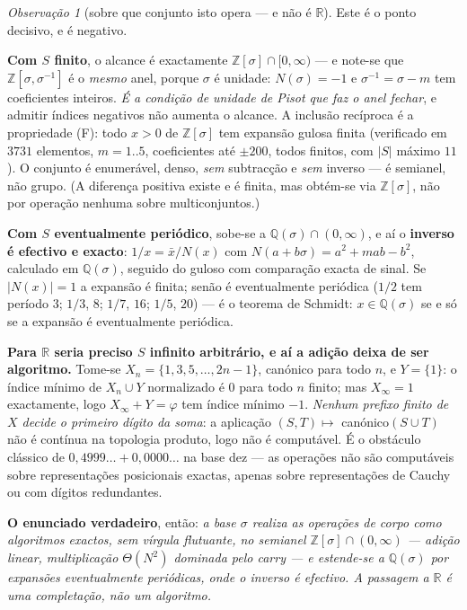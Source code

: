 \documentclass[11pt,a4paper]{article}
\theoremstyle{plain}
\theoremstyle{definition}
\theoremstyle{remark}
\newtheorem{obs}[teorema]{Observação}
\newcommand{\R}{\mathbb{R}}
\newcommand{\Q}{\mathbb{Q}}
\newcommand{\Z}{\mathbb{Z}}
\begin{document}
\begin{obs}[sobre que conjunto isto opera --- e não é $\R$]\label{obs:opfecha}
Este é o ponto decisivo, e é negativo.

\textbf{Com $S$ finito}, o alcance é exactamente $\Z[\sigma]\cap[0,\infty)$ --- e note-se que
$\Z[\sigma,\sigma^{-1}]$ é o \emph{mesmo} anel, porque $\sigma$ é unidade: $N(\sigma) = -1$ e
$\sigma^{-1} = \sigma-m$ tem coeficientes inteiros. \emph{É a condição de unidade de Pisot que faz
o anel fechar}, e admitir índices negativos não aumenta o alcance. A inclusão recíproca é a
propriedade (F): todo $x>0$ de $\Z[\sigma]$ tem expansão gulosa finita (verificado em $3731$
elementos, $m=1..5$, coeficientes até $\pm200$, todos finitos, com $|S|$ máximo $11$). O conjunto é
enumerável, denso,
\emph{sem} subtracção e \emph{sem} inverso --- é semianel, não grupo. (A diferença positiva existe
e é finita, mas obtém-se via $\Z[\sigma]$, não por operação nenhuma sobre multiconjuntos.)

\textbf{Com $S$ eventualmente periódico}, sobe-se a $\Q(\sigma)\cap(0,\infty)$, e aí o
\textbf{inverso é efectivo e exacto}: $1/x = \bar x / N(x)$ com $N(a+b\sigma) = a^2+mab-b^2$,
calculado em $\Q(\sigma)$, seguido do guloso com comparação exacta de sinal. Se $|N(x)|=1$ a
expansão é finita; senão é eventualmente periódica ($1/2$ tem período $3$; $1/3$, $8$; $1/7$, $16$;
$1/5$, $20$) --- é o teorema de Schmidt: $x\in\Q(\sigma)$ se e só se a expansão é eventualmente
periódica.

\textbf{Para $\R$ seria preciso $S$ infinito arbitrário, e aí a adição deixa de ser algoritmo.}
Tome-se $X_n = \{1,3,5,\dots,2n-1\}$, canónico para todo $n$, e $Y=\{1\}$: o índice mínimo de
$X_n\cup Y$ normalizado é $0$ para todo $n$ finito; mas $X_\infty = 1$ exactamente, logo
$X_\infty + Y = \varphi$ tem índice mínimo $-1$. \emph{Nenhum prefixo finito de $X$ decide o
primeiro dígito da soma}: a aplicação $(S,T)\mapsto$ canónico$(S\cup T)$ não é contínua na topologia
produto, logo não é computável. É o obstáculo clássico de $0{,}4999\ldots + 0{,}0000\ldots$ na base
dez --- as operações não são computáveis sobre representações posicionais exactas, apenas sobre
representações de Cauchy ou com dígitos redundantes.

\medskip
\noindent\textbf{O enunciado verdadeiro}, então: \emph{a base $\sigma$ realiza as operações de
corpo como algoritmos exactos, sem vírgula flutuante, no semianel $\Z[\sigma]\cap(0,\infty)$ ---
adição linear, multiplicação $\Theta(N^2)$ dominada pelo \emph{carry} --- e estende-se a
$\Q(\sigma)$ por expansões eventualmente periódicas, onde o inverso é efectivo. A passagem a $\R$
é uma completação, não um algoritmo.}


\end{obs}
\end{document}

